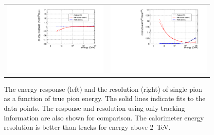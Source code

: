 \documentclass{PoS}
\begin{document}
\begin{figure}
\begin{center}
\begin{tabular}{cc}
\includegraphics[width=.5\textwidth]{figs/pi_response.pdf} & 
\includegraphics[width=.5\textwidth]{figs/pi_resolution.pdf}\\
\end{tabular}
\end{center}
\caption{The energy response (left) and the resolution (right) of single 
pion as a function of true pion energy. The solid lines indicate fits to 
the data points. The response and resolution using only tracking information 
 are also shown for comparison. The calorimeter energy resolution is better 
than tracks for energy above 2~TeV. }
\label{fig:piresponse}
\end{figure}
\end{document}

